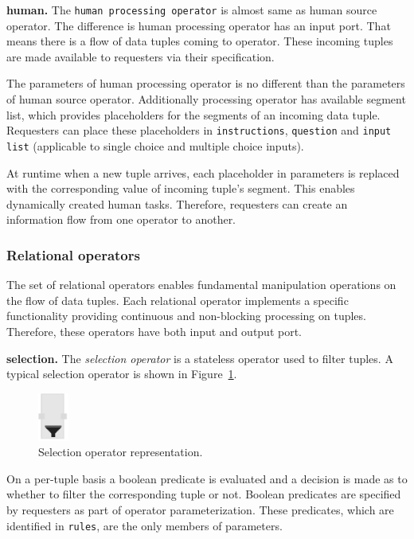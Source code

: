 \textbf{human.}
The \texttt{human processing operator} is almost same as human source operator. 
The difference is human processing operator has an input port. That means there is a 
flow of data tuples coming to operator. These incoming tuples are made available 
to requesters via their specification.

The parameters of human processing operator is no different than the parameters of 
human source operator. Additionally processing operator has available segment list, which 
provides placeholders for the segments of an incoming data tuple. Requesters can place 
these placeholders in \texttt{instructions}, \texttt{question} and \texttt{input list} 
(applicable to single choice and multiple choice inputs).

At runtime when a new tuple arrives, each placeholder in parameters is replaced with 
the corresponding value of incoming tuple's segment. This enables dynamically created human 
tasks. Therefore, requesters can create an information flow from one operator to another.

\subsubsection{Relational operators}
The set of relational operators enables fundamental manipulation operations on 
the flow of data tuples. Each relational operator implements a specific functionality 
providing continuous and non-blocking processing on tuples. Therefore, these operators 
have both input and output port.

\textbf{selection.}
The \textit{selection operator} is a stateless operator used to filter tuples. A typical 
selection operator is shown in Figure~\ref{fig:selection operator}.

\begin{figure}[ht]
	\centering
	\includegraphics[height=60px]{figures/SelectionOperator.pdf}
	\caption{Selection operator representation.}
	\label{fig:selection operator}
\end{figure}

On a per-tuple basis a boolean predicate is evaluated and a decision is made as 
to whether to filter the corresponding tuple or not. Boolean predicates are specified 
by requesters as part of operator parameterization. These predicates, which are 
identified in \texttt{rules}, are the only members of parameters.

